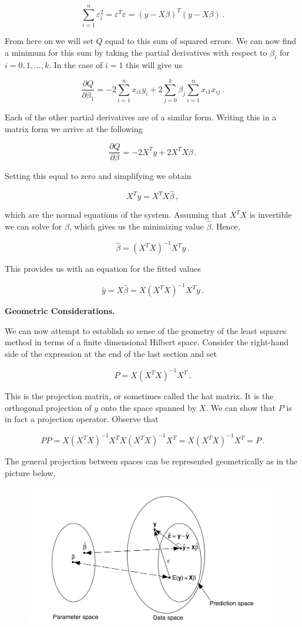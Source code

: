 \documentclass[a4paper]{article}
\numberwithin{equation}{section}
\begin{document}
\begin{description}
$$\sum_{i=1}^n \varepsilon_i^2 = \varepsilon^T\varepsilon = (y-X\beta)^T(y-X\beta)\,.$$

From here on we will set $Q$ equal to this sum of squared errors. We can now find a minimum for this sum by taking the partial derivatives with respect to $\beta_i$ for $i = 0,1,\dots,k$. In the case of $i=1$ this will give us

$$\frac{\partial Q}{\partial \beta_1} = -2\sum_{i=1}^n x_{i1}y_i + 2\sum_{j=0}^k\beta_j\sum_{i=1}^nx_{i1}x_{ij}\,.$$

Each of the other partial derivatives are of a similar form. Writing this in a matrix form we arrive at the following

$$\frac{\partial Q}{\partial \beta} = -2X^Ty + 2X^TX\beta\,.$$

Setting this equal to zero and simplifying we obtain

$$X^Ty = X^TX\hat{\beta}\,,$$

which are the normal equations of the system. Assuming that $X^TX$ is invertible we can solve for $\beta$, which gives us the minimizing value $\hat{\beta}$. Hence,

$$\hat{\beta} = (X^TX)^{-1}X^Ty\,.$$

This provides us with an equation for the fitted values

$$\hat{y} = X\hat{\beta} = X(X^TX)^{-1}X^Ty\,.$$

\item\textbf{Geometric Considerations.}

We can now attempt to establish so sense of the geometry of the least squares method in terms of a finite dimensional Hilbert space. Consider the right-hand side of the expression at the end of the last section and set

$$P = X(X^TX)^{-1}X^T\,.$$

This is the projection matrix, or sometimes called the hat matrix. It is the orthogonal projection of $y$ onto the space spanned by $X$. We can show that $P$ is in fact a projection operator. Observe that

$$PP = X(X^TX)^{-1}X^TX(X^TX)^{-1}X^T = X(X^TX)^{-1}X^T = P\,.$$

The general projection between spaces can be represented geometrically as in the picture below.

\begin{figure}[b]
	\centering
	
    \includegraphics[scale=.3]{MultiLinearRegGeometric.png}
\end{figure}


\end{description}
\end{document}
